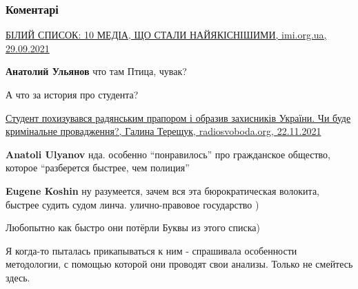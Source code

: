  
 
 
 
 
\subsubsection{Коментарі}
\label{sec:25_11_2021.fb.uljanov_anatolij.1.usaid_ukr_propaganda.cmt}

\begin{itemize} %

\href{https://imi.org.ua/monitorings/bilyj-spysok-10-media-shho-staly-najyakisnishymy-i41541}{%
БІЛИЙ СПИСОК: 10 МЕДІА, ЩО СТАЛИ НАЙЯКІСНІШИМИ, imi.org.ua, 29.09.2021%
}


\begin{itemize} %
\textbf{Анатолий Ульянов} что там Птица, чувак?
\end{itemize} %

А что за история про студента?

\begin{itemize} %

\href{https://www.radiosvoboda.org/a/komunizm-totalitarnyy-rezhym-symvoilka/31573870.html}{%
Студент похизувався радянським прапором і образив захисників України. Чи буде кримінальне провадження?, %
Галина Терещук, radiosvoboda.org, 22.11.2021%
}

\textbf{Anatoli Ulyanov} нда. особенно \enquote{понравилось} про гражданское общество, которое \enquote{разберется быстрее, чем полиция}

\textbf{Eugene Koshin} ну разумеется, зачем вся эта бюрократическая волокита, быстрее судить судом линча. улично-правовое государство )

\end{itemize} %

Любопытно как быстро они потёрли Буквы из этого списка)


Я когда-то пыталась прикапываться к ним - спрашивала особенности методологии, с
помощью которой они проводят свои анализы. Только не смейтесь здесь.



\end{itemize}
